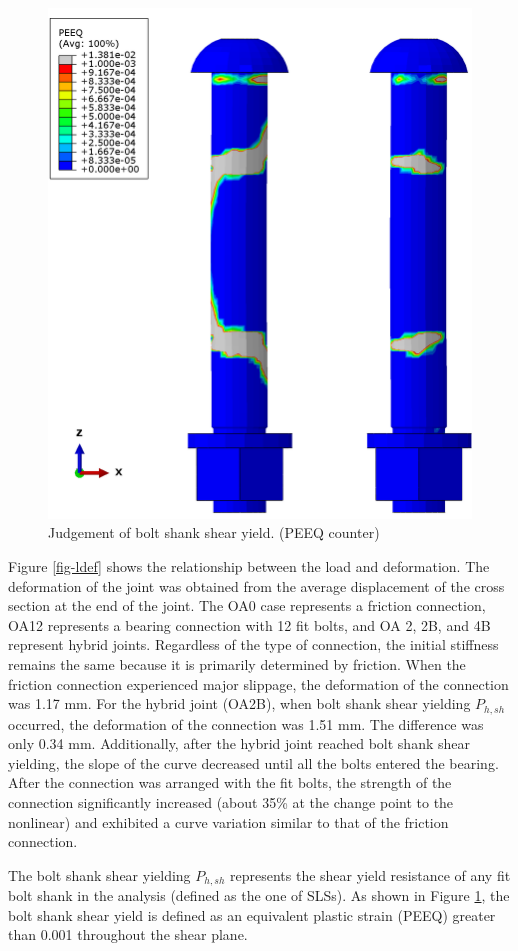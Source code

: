\begin{figure}[htbp]
    \centering
    \includegraphics[width=0.5\linewidth]{imgs/ch7/bsh-jud-peeq.png}
    \caption{Judgement of bolt shank shear yield. (PEEQ counter)}
    \label{fig-bsh-jud-peeq}
\end{figure}

Figure \ref{fig-ldef} shows the relationship between the load and deformation. The deformation of the joint was obtained from the average displacement of the cross section at the end of the joint. The OA0 case represents a friction connection, OA12 represents a bearing connection with 12 fit bolts, and OA 2, 2B, and 4B represent hybrid joints. Regardless of the type of connection, the initial stiffness remains the same because it is primarily determined by friction. When the friction connection experienced major slippage, the deformation of the connection was 1.17 mm. For the hybrid joint (OA2B), when bolt shank shear yielding $P_{h,sh}$ occurred, the deformation of the connection was 1.51 mm. The difference was only 0.34 mm. Additionally, after the hybrid joint reached bolt shank shear yielding, the slope of the curve decreased until all the bolts entered the bearing. After the connection was arranged with the fit bolts, the strength of the connection significantly increased (about 35\% at the change point to the nonlinear) and exhibited a curve variation similar to that of the friction connection.

The bolt shank shear yielding $P_{h,sh}$ represents the shear yield resistance of any fit bolt shank in the analysis (defined as the one of SLSs). As shown in Figure \ref{fig-bsh-jud-peeq}, the bolt shank shear yield is defined as an equivalent plastic strain (PEEQ) greater than 0.001 throughout the shear plane.


